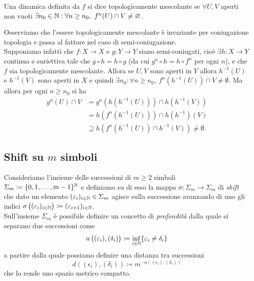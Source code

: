 \begin{definition}
	Una dinamica definita da $ f $ si dice topologicamente mescolante se $ \forall U, V $ aperti non vuoti $ \exists n_0 \in \mathbb{N} : \forall n \geq n_0, \ f^n(U) \cap V \neq \varnothing $. 
\end{definition}

Osserviamo che l'essere topologicamente mescolante è invariante per coniugazione topologia e passa al fattore nel caso di semi-coniugazione. \\
Supponiamo infatti che $ f \colon X \to X $ e $ g \colon Y \to Y $ siano semi-coniugati, cioè $ \exists h \colon X \to Y $ continua e suriettiva tale che $ g \circ h = h \circ g $ (da cui $ g^n \circ h = h \circ f^n $ per ogni $ n $), e che $ f $ sia topologicamente mescolante. Allora se $ U, V $ sono aperti in $ Y $ allora $ h^{-1}(U) $ e $ h^{-1}(V) $ sono aperti in $ X $ e quindi $ \exists n_0 : \forall n \geq n_0, \ f^{n}(h^{-1}(U)) \cap V \neq \emptyset $. Ma allora per ogni $ n \geq n_0 $ si ha 
\begin{align*}
    g^n(U) \cap V & = g^{n}(h(h^{-1}(U))) \cap h(h^{-1}(V)) \\
    & = h(f^n(h^{-1}(U))) \cap h(h^{-1})(V) \\
    & \supseteq h\left(f^n(h^{-1}(U)) \cap h^{-1}(V)\right) \neq \emptyset.
\end{align*}

\subsection{Shift su $ m $ simboli}
Consideriamo l'insieme delle successioni di $ m \geq 2 $ simboli $ \Sigma_m \coloneqq \{0, 1, \ldots, m-1\}^{\mathbb{N}} $ e definiamo su di esso la mappa $ \sigma \colon \Sigma_m \to \Sigma_m $ di \emph{shift} che dato un elemento $ (\varepsilon_i)_{i \in \mathbb{N}} \in \Sigma_m $ agisce sulla successione avanzando di uno gli indici $ \sigma\left((\varepsilon_i)_{i \in \mathbb{N}}\right) \coloneqq (\varepsilon_{i + 1})_{i \in \mathbb{N}} $. \\

Sull'insieme $ \Sigma_m $ è possibile definire un concetto di \emph{profondità} dalla quale si separano due successioni come 
\[
a\left((\varepsilon_i), (\delta_i)\right) \coloneqq \inf_{i \in \mathbb{N}} \{\varepsilon_i \neq \delta_i\}
\]
a partire dalla quale possiamo definire una distanza tra successioni 
\[
d\left((\epsilon_i), (\delta_i)\right) \coloneqq m^{-a\left((\epsilon_i), (\delta_i)\right)}
\]
che lo rende uno spazio metrico compatto. \\

